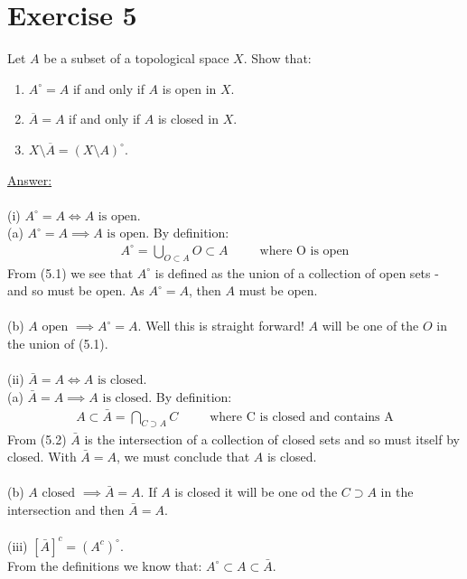\documentclass[12pt]{article}
\begin{document}
\section*{Exercise 5}
 Let \(A\) be a subset of a topological space
\(X\). Show that:
\begin{enumerate}
\item[i)] \(A^\circ=A\) if and only if \(A\) is open in \(X\).
\item[ii)] \(\overline{A}=A\) if and only if \(A\) is closed in \(X\).
\item[iii)] \(X\setminus\overline{A}=(X\setminus A)^\circ\).
\end{enumerate}
\vspace{1cm}
\noindent
\underline{Answer:}\\
\\
(i) $A^\circ = A \iff A \text{ is open}$. \\
(a) $A^\circ = A \implies A \text{ is open}$.  By definition:
\begin{align*}
 A^\circ = \bigcup_{O \subset A} O \subset A \;\;\;\;\;\;\;\;\; \text{where O is open} \tag{5.1}
\end{align*}
From (5.1) we see that $A^\circ$ is defined as the union of a collection of open sets - and so must be open.  As $A^\circ = A$, then
$A$ must be open.\\
\\
(b) $A \text{ open } \implies A^\circ=A$.  Well this is straight forward!  $A$ will be one of the $O$ in the union of (5.1).\\
\\
(ii) $\bar{A} = A \iff A \text{ is closed}$. \\
(a) $\bar{A} = A \implies A \text{ is closed}$.  By definition:
\begin{align*}
 A \subset \bar{A} = \bigcap_{C \supset A} C  \;\;\;\;\;\;\;\;\; \text{where C is closed and contains A} \tag{5.2}
\end{align*}
From (5.2) $\bar{A}$ is the intersection of a collection of closed sets and so must itself by closed.  With $\bar{A} = A$, we must conclude that $A$
is closed.\\
\\
(b) $A \text{ closed } \implies \bar{A}=A$.  If $A$ is closed it will be one od the $C \supset A$ in the intersection and then $\bar{A} = A$.\\
\\
(iii) $[\bar{A}]^c = (A^c)^\circ$.\\
From the definitions we know that: $A^\circ \subset A \subset \bar{A}$.\\
\end{document}

